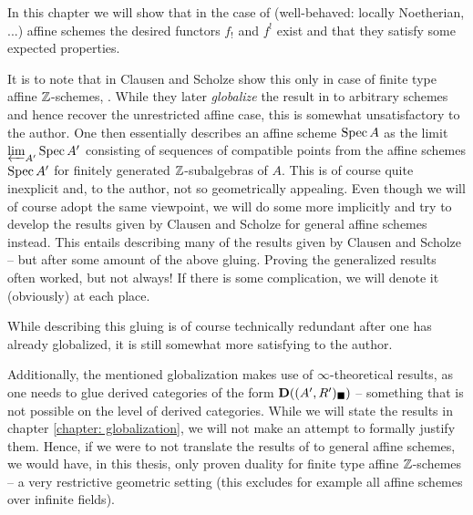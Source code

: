 
In this chapter we will show that in the case of (well-behaved: locally Noetherian, ...) affine schemes the desired functors $f_!$ and $f^!$ exist and that they satisfy some expected properties. 

It is to note that in \cite{condenseddotpdf} Clausen and Scholze show this only in case of finite type affine ${\mathbb{Z}}$-schemes, \confer \cite[theorem 8.13]{condenseddotpdf}. While they later \emph{globalize} the result in \cite[Chapters X \& XI]{condenseddotpdf} to arbitrary schemes and hence recover the unrestricted affine case, this is somewhat unsatisfactory to the author. One then essentially describes an affine scheme $\operatorname{Spec} A$ as the limit $\varprojlim_{A'} \operatorname{Spec} A'$ consisting of sequences of compatible points from the affine schemes $\operatorname{Spec} A'$ for finitely generated ${\mathbb{Z}}$-subalgebras of $A$. This is of course quite inexplicit and, to the author, not so geometrically appealing. Even though we will of course adopt the same viewpoint, we will do some more implicitly and try to develop the results given by Clausen and Scholze for general affine schemes instead. This entails describing many of the results given by Clausen and Scholze -- but after some amount of the above gluing. Proving the generalized results often worked, but not always! If there is some complication, we will denote it (obviously) at each place.

While  describing this gluing is of course technically redundant after one has already globalized, it is still somewhat more satisfying to the author.

Additionally, the mentioned globalization makes use of $\infty$-theoretical results, as one needs to glue derived categories of the form ${{\mathbf{D}}((A', R')_\blacksquare)}$ -- something that is not possible on the level of  derived categories. While we will state the results in chapter \ref{chapter: globalization}, we will not make an attempt to formally justify them. Hence, if we were to not translate the results of \cite[theorem 8.13]{condenseddotpdf} to general affine schemes, we would have, in this thesis, only proven duality for finite type affine ${\mathbb{Z}}$-schemes -- a very restrictive geometric setting (this excludes for example all affine schemes over infinite fields).

